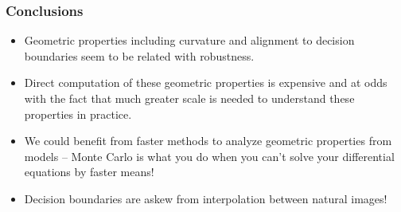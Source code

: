 
\begin{frame}
  \frametitle{Conclusions}
  \begin{itemize}
    \item Geometric properties including curvature and alignment to
      decision boundaries seem to be related with robustness.
      \item Direct computation of these geometric properties is
        expensive and at odds with the fact that much greater scale is
        needed to understand these properties in practice.
        \item We could benefit from faster methods to analyze
          geometric properties from models -- Monte Carlo is what you
          do when you can't solve your differential equations by
          faster means!
          \item Decision boundaries are askew from interpolation
            between natural images!
          \end{itemize}
        \end{frame}

